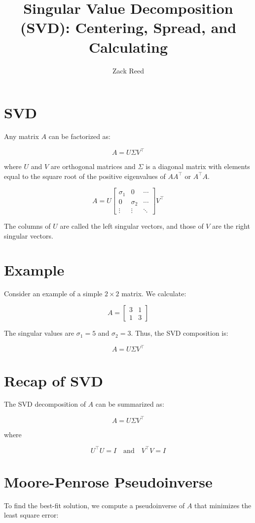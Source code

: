 \documentclass{ximera}
\author{Zack Reed}
\title{Singular Value Decomposition (SVD): Centering, Spread, and Calculating}
\begin{document}
\begin{abstract}

\end{abstract}
\maketitle


\section{SVD}
Any matrix \(A\) can be factorized as:

\[
A = U \Sigma V^\top
\]

where \(U\) and \(V\) are orthogonal matrices and \(\Sigma\) is a diagonal matrix with elements equal to the square root of the positive eigenvalues of \(AA^\top\) or \(A^\top A\).

\[
A = U \begin{bmatrix} \sigma_1 & 0 & \cdots \\ 0 & \sigma_2 & \cdots \\ \vdots & \vdots & \ddots \end{bmatrix} V^\top
\]

The columns of \(U\) are called the left singular vectors, and those of \(V\) are the right singular vectors.

\section{Example}
Consider an example of a simple \(2 \times 2\) matrix. We calculate:

\[
A = \begin{bmatrix} 3 & 1 \\ 1 & 3 \end{bmatrix}
\]

The singular values are \(\sigma_1 = 5\) and \(\sigma_2 = 3\). Thus, the SVD composition is:

\[
A = U \Sigma V^\top
\]

\section{Recap of SVD}
The SVD decomposition of \(A\) can be summarized as:

\[
A = U \Sigma V^\top
\]

where

\[
U^\top U = I \quad \text{and} \quad V^\top V = I
\]

\section{Moore-Penrose Pseudoinverse}
To find the best-fit solution, we compute a pseudoinverse of \(A\) that minimizes the least square error:
\end{document}
